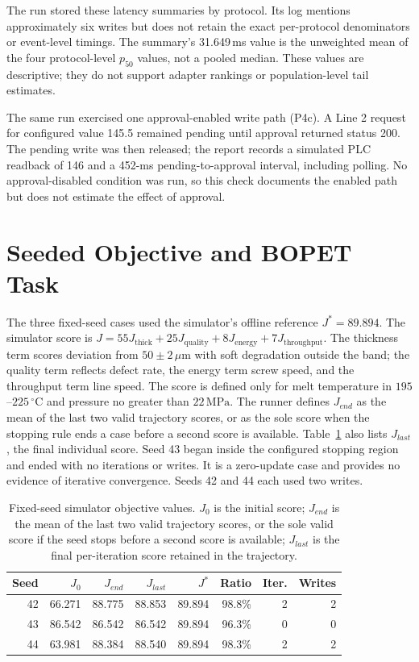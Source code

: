 \documentclass[journal]{IEEEtran}
\begin{document}
The run stored these latency summaries by protocol. Its log mentions
approximately six writes but does not retain the exact per-protocol
denominators or event-level timings. The summary's 31.649\,ms value is the
unweighted mean of the four protocol-level $p_{50}$ values, not a pooled
median. These values are descriptive; they do not support adapter rankings or
population-level tail estimates.

The same run exercised one approval-enabled write path (P4c). A Line 2
request for configured value 145.5 remained pending until approval returned
status 200. The pending write was then released; the report records a simulated
PLC readback of 146 and a 452-ms pending-to-approval interval, including
polling. No approval-disabled condition was run, so this check documents the
enabled path but does not estimate the effect of approval.

\section{Seeded Objective and BOPET Task}
The three fixed-seed cases used the simulator's offline reference
$J^*=89.894$. The simulator score is
$J=55J_{\mathrm{thick}}+25J_{\mathrm{quality}}+8J_{\mathrm{energy}}+7J_{\mathrm{throughput}}$.
The thickness term scores deviation from $50\pm2\,\mu\mathrm{m}$ with soft
degradation outside the band; the quality term reflects defect rate, the
energy term screw speed, and the throughput term line speed. The score is
defined only for melt temperature in $195$--$225\,^{\circ}\mathrm{C}$ and
pressure no greater than $22\,\mathrm{MPa}$. The runner defines $J_{end}$ as
the mean of the last two valid trajectory scores, or as the sole score when
the stopping rule ends a case before a second score is available.
Table~\ref{tab:s6-seeds} also lists $J_{last}$, the final individual score.
Seed 43 began inside the configured stopping region and ended with no
iterations or writes. It is a zero-update case and provides no evidence of
iterative convergence. Seeds 42 and 44 each used two writes.

\begin{table}[!t]
\centering
\caption{Fixed-seed simulator objective values. $J_0$ is the initial score;
$J_{end}$ is the mean of the last two valid trajectory scores, or the sole valid score if the seed stops
before a second score is available; $J_{last}$ is the final per-iteration
score retained in the trajectory.}
\label{tab:s6-seeds}
\footnotesize
\setlength{\tabcolsep}{3pt}
\begin{tabular}{@{}r r r r r r r r@{}}
\toprule
Seed & $J_0$ & $J_{end}$ & $J_{last}$ & $J^*$ & Ratio & Iter. & Writes\\
\midrule
42 & 66.271 & 88.775 & 88.853 & 89.894 & 98.8\% & 2 & 2\\
43 & 86.542 & 86.542 & 86.542 & 89.894 & 96.3\% & 0 & 0\\
44 & 63.981 & 88.384 & 88.540 & 89.894 & 98.3\% & 2 & 2\\
\bottomrule
\end{tabular}
\end{table}
\end{document}
